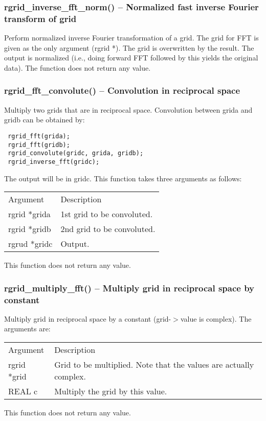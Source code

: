 \documentclass[12pt,letterpaper]{article}
\begin{document}
\subsubsection{rgrid\_inverse\_fft\_norm() -- Normalized fast inverse Fourier transform of grid}

Perform normalized inverse Fourier transformation of a grid. The grid for FFT is given as the only argument (rgrid *). The grid is overwritten by the result. The output is normalized (i.e., doing forward FFT followed by this yields the original data). The function does not return any value.

\subsubsection{rgrid\_fft\_convolute() -- Convolution in reciprocal space}

Multiply two grids that are in reciprocal space. Convolution between grida and gridb can be obtained by:
\begin{verbatim}
 rgrid_fft(grida);
 rgrid_fft(gridb);
 rgrid_convolute(gridc, grida, gridb);
 rgrid_inverse_fft(gridc);
\end{verbatim}
The output will be in gridc. This function takes three arguments as follows:
\begin{longtable}{p{} p{}}
Argument & Description\\
\cline{1-2}
rgrid *grida & 1st grid to be convoluted.\\ 
rgrid *gridb & 2nd grid to be convoluted.\\
rgrud *gridc & Output.\\
\end{longtable}
\noindent
This function does not return any value.

\subsubsection{rgrid\_multiply\_fft() -- Multiply grid in reciprocal space by constant}

Multiply grid in reciprocal space by a constant (grid-$>$value is complex). The arguments are:
\begin{longtable}{p{} p{}}
Argument & Description\\
\cline{1-2}
rgrid *grid & Grid to be multiplied. Note that the values are actually complex.\\
REAL c & Multiply the grid by this value.\\
\end{longtable}
\noindent
This function does not return any value.
\end{document}
